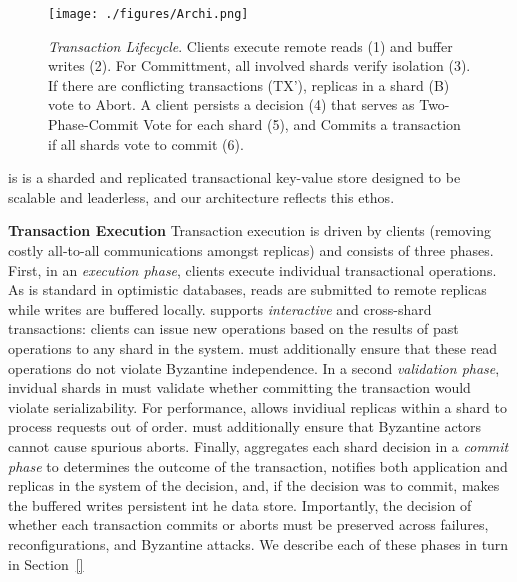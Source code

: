 
\begin{figure*}[!th]
\begin{center}
\texttt{[image: ./figures/Archi.png]}
\end{center}
\caption{{\em Transaction Lifecycle}. Clients execute remote reads (1) and buffer writes (2). For Committment, all involved shards verify isolation (3). If there are conflicting transactions (TX'), replicas in a shard (B) vote to Abort. A client persists a decision (4) that serves as Two-Phase-Commit Vote for each shard (5), and Commits a transaction if all shards vote to commit (6).}
\label{fig:Figure1}
\end{figure*}
 

\sys is is a sharded and replicated transactional key-value store designed to be scalable and leaderless, and our architecture reflects this ethos. 

\par \textbf{Transaction Execution} Transaction execution is driven by clients (removing costly all-to-all communications amongst replicas) and consists of three phases. First, in an \textit{execution phase}, clients execute individual transactional operations. As is standard in optimistic databases, reads are submitted to remote replicas while writes are buffered locally. \sys{} supports \textit{interactive} and cross-shard transactions: clients can issue new operations based on the results of past operations to any shard in the system. \sys{} must additionally ensure that these read operations do not violate Byzantine independence. In a second \textit{validation phase}, invidual shards in \sys{} must validate whether committing the transaction would violate serializability. For performance, \sys{} allows invidiual replicas within a shard to process requests out of order. \sys{} must additionally ensure that Byzantine actors cannot cause spurious aborts. Finally, \sys{} aggregates each shard decision in a \textit{commit phase} to determines the outcome of the transaction, notifies both application and replicas in the system of the decision, and, if the decision was to commit, makes the buffered writes persistent int he data store.  Importantly, the decision of whether each transaction commits or aborts must be preserved across failures, reconfigurations, and Byzantine attacks. We describe each of these phases in turn in Section~\ref{}


